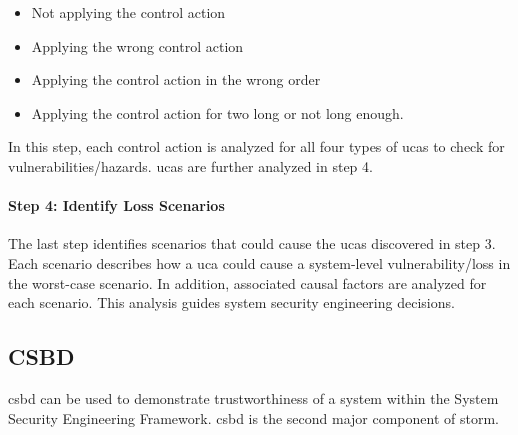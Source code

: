 \documentclass[../../main/main.tex]{subfiles}
\begin{document}
\begin{itemize}
\item Not applying the control action
\item Applying the wrong control action
\item Applying the control action in the wrong order
\item Applying the control action for two long or not long enough.
\end{itemize}

In this step, each control action is analyzed for all four types of \gls{uca}s to check for vulnerabilities/hazards.  \gls{uca}s are further analyzed in step 4.


\paragraph*{Step 4: Identify Loss Scenarios}
The last step identifies scenarios that could cause the \gls{uca}s discovered in step 3.  Each scenario describes how a \gls{uca} could cause a system-level vulnerability/loss in the worst-case scenario.  In addition, associated causal factors are analyzed for each scenario.  This analysis guides system security engineering decisions.


%
%
%
\subsection{CSBD}\label{ssec:csbd}

\gls{csbd} can be used to demonstrate trustworthiness of a system within the System Security Engineering Framework.  \gls{csbd} is the second major component of \gls{storm}.
\end{document}
